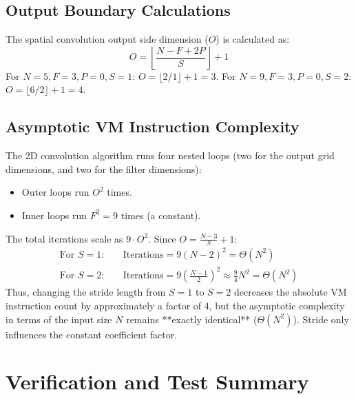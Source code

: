 \documentclass[11pt,a4paper]{article}
\begin{document}
\subsection{Output Boundary Calculations}

The spatial convolution output side dimension ($O$) is calculated as:
\begin{equation*}
O = \left\lfloor \frac{N - F + 2P}{S} \right\rfloor + 1
\end{equation*}
For $N = 5, F = 3, P = 0, S = 1$: $O = \lfloor 2/1 \rfloor + 1 = 3$. 
For $N = 9, F = 3, P = 0, S = 2$: $O = \lfloor 6/2 \rfloor + 1 = 4$.

\subsection{Asymptotic VM Instruction Complexity}

The 2D convolution algorithm runs four nested loops (two for the output grid dimensions, and two for the filter dimensions):
\begin{itemize}
    \item Outer loops run $O^2$ times.
    \item Inner loops run $F^2 = 9$ times (a constant).
\end{itemize}
The total iterations scale as $9 \cdot O^2$. Since $O = \frac{N - 3}{S} + 1$:
\begin{align*}
\text{For } S = 1: \quad & \text{Iterations} = 9(N-2)^2 = \Theta(N^2) \\
\text{For } S = 2: \quad & \text{Iterations} = 9\left(\frac{N-1}{2}\right)^2 \approx \frac{9}{4}N^2 = \Theta(N^2)
\end{align*}
Thus, changing the stride length from $S=1$ to $S=2$ decreases the absolute VM instruction count by approximately a factor of 4, but the asymptotic complexity in terms of the input size $N$ remains **exactly identical** ($\Theta(N^2)$). Stride only influences the constant coefficient factor.

\section{Verification and Test Summary}
\end{document}
